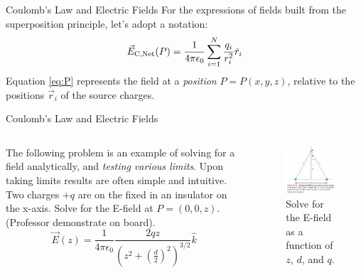 \documentclass{beamer}
\begin{document}
\begin{frame}{Coulomb’s Law and Electric Fields}
For the expressions of fields built from the superposition principle, let's adopt a notation:
\begin{equation}
\vec{E}_{\rm C,Net}(P) = \frac{1}{4\pi\epsilon_{\rm 0}} \sum_{i = 1}^N \frac{q_i}{r_i^2}\hat{r}_i \label{eq:P}
\end{equation}
Equation \ref{eq:P} represents the field at a \textit{position} $P = P(x,y,z)$, relative to the positions $\vec{r}_i$ of the source charges.
\end{frame}

\begin{frame}{Coulomb’s Law and Electric Fields}
\small
\begin{columns}[T]
\begin{column}{0.5\textwidth}
The following problem is an example of solving for a field analytically, and \textit{testing various limits}.  Upon taking limits results are often simple and intuitive. \\ \vspace{0.5cm}
Two charges $+q$ are on the fixed in an insulator on the x-axis.  Solve for the E-field at $P = (0,0,z)$. \\ \vspace{0.5cm}
(Professor demonstrate on board).
\begin{equation}
\vec{E}(z) = \frac{1}{4\pi\epsilon_0} \frac{2qz}{\left(z^2+\left(\frac{d}{2}\right)^2\right)^{3/2}} \hat{k}
\end{equation}
\end{column}
\begin{column}{0.5\textwidth}
\begin{figure}
\includegraphics[width=\textwidth]{figures/twoChargesZ.png}
\caption{\label{fig:twoChargesZ} Solve for the E-field as a function of $z$, $d$, and $q$.}
\end{figure}
\end{column}
\end{columns}
\end{frame}
\end{document}
